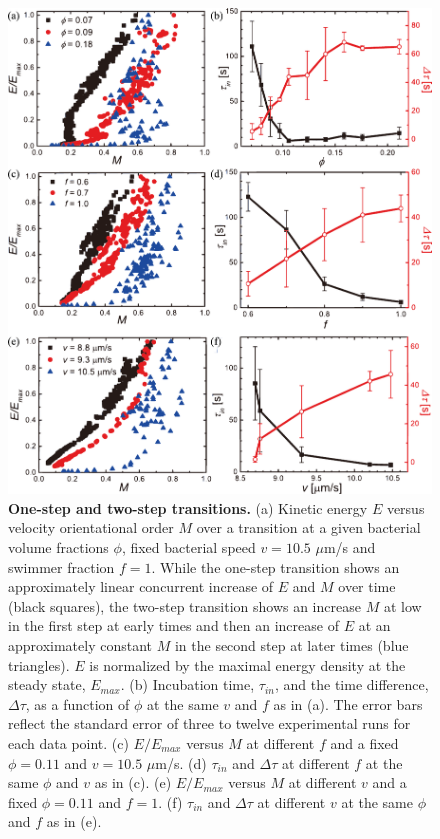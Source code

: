 \begin{figure}[!htbp]
	\begin{center}
	\includegraphics[height=5 in]{Figs/4-Emergence/4.pdf}
	\end{center}
	\caption[One-step and two-step transitions]
	{
	\textbf{One-step and two-step transitions.}
  (a) Kinetic energy $E$ versus velocity orientational order $M$ over a transition at a given bacterial volume fractions $\phi$, fixed bacterial speed $v = 10.5$ $\mu$m/s and swimmer fraction $f = 1$. While the one-step transition shows an approximately linear concurrent increase of $E$ and $M$ over time (black squares), the two-step transition shows an increase $M$ at low in the first step at early times and then an increase of $E$ at an approximately constant $M$ in the second step at later times (blue triangles). $E$ is normalized by the maximal energy density at the steady state, $E_{max}$.
  (b) Incubation time, $\tau_{in}$, and the time difference, $\Delta\tau$, as a function of $\phi$ at the same $v$ and $f$ as in (a). The error bars reflect the standard error of three to twelve experimental runs for each data point.
  (c) $E/E_{max}$ versus $M$ at different $f$ and a fixed $\phi= 0.11$  and $v = 10.5$ $\mu$m/s.
  (d) $\tau_{in}$ and $\Delta\tau$ at different $f$ at the same $\phi$ and $v$ as in (c).
  (e) $E/E_{max}$ versus $M$ at different $v$ and a fixed $\phi= 0.11$  and $f = 1$.
  (f) $\tau_{in}$ and $\Delta\tau$ at different $v$ at the same $\phi$ and $f$ as in (e).
	}
	\label{fig:4-two-step}
\end{figure}




